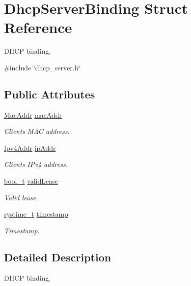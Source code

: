 \hypertarget{structDhcpServerBinding}{}\section{Dhcp\+Server\+Binding Struct Reference}
\label{structDhcpServerBinding}


D\+H\+CP binding.  




{\ttfamily \#include \char`\"{}dhcp\+\_\+server.\+h\char`\"{}}

\subsection*{Public Attributes}
\begin{DoxyCompactItemize}
\item 
\hyperlink{ethernet_8h_a1e00ed3977e8a770e8b4ae4cb306d1c0}{Mac\+Addr} \hyperlink{structDhcpServerBinding_a1bc8376a7a0ac99fd159f3f2650671b4}{mac\+Addr}
\begin{DoxyCompactList}\small\item\em Client\textquotesingle{}s M\+AC address. \end{DoxyCompactList}\item 
\hyperlink{ipv4_8h_a411debb3d770caa0c06d3f73367da37f}{Ipv4\+Addr} \hyperlink{structDhcpServerBinding_a1e389f0baa8490f1bbbcd2c1a83c7ad5}{ip\+Addr}
\begin{DoxyCompactList}\small\item\em Client\textquotesingle{}s I\+Pv4 address. \end{DoxyCompactList}\item 
\hyperlink{compiler__port_8h_a812d16e5494522586b3784e55d479912}{bool\+\_\+t} \hyperlink{structDhcpServerBinding_a3f86ea591925b77ded04d37e424ab3d9}{valid\+Lease}
\begin{DoxyCompactList}\small\item\em Valid lease. \end{DoxyCompactList}\item 
\hyperlink{compiler__port_8h_ae3e32a98d431a02106616da3071832dd}{systime\+\_\+t} \hyperlink{structDhcpServerBinding_ad0aee5bda4907f14bc7ca6c20cadfb09}{timestamp}
\begin{DoxyCompactList}\small\item\em Timestamp. \end{DoxyCompactList}\end{DoxyCompactItemize}


\subsection{Detailed Description}
D\+H\+CP binding. 

